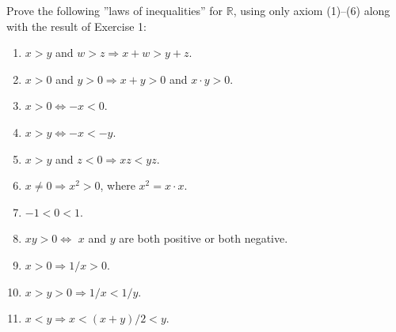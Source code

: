 \documentclass[a4paper,12pt]{article}
\begin{document}
\begin{exe}
	Prove the following ''laws of inequalities'' for \( \mathbb{R} \),
	using only axiom (1)--(6)
	along with the result of Exercise 1:
\end{exe}
\begin{enumerate}
	\item
	      \( x>y \)
	      and
	      \( w>z \Rightarrow x+w>y+z\).
	      
	\item
	      \( x>0 \)
	      and
	      \( y>0 \Rightarrow x+y>0\)
	      and
	      \( x \cdot y >0 \).
	      
	\item
	      \(  x>0 \Leftrightarrow -x <0\).
	      
	\item
	      \( x>y \Leftrightarrow -x < -y \).
	      
	\item
	      \( x>y \)
	      and
	      \( z<0 \Rightarrow xz<yz\).
	      
	\item
	      \( x \neq 0 \Rightarrow x^2 >0 \),
	      where \( x^2=x \cdot x \).
	      
	\item
	      \( -1 < 0< 1 \).
	      
	\item
	      \( xy>0 \Leftrightarrow \) \( x \) and \( y \) are both
	      positive or both negative. 
	      
	\item
	      \( x>0 \Rightarrow 1/x >0 \).
	      
	\item
	      \( x>y>0 \Rightarrow 1/x < 1/y \).
	      
	\item
	      \( x<y \Rightarrow x<(x+y)/2<y \).
\end{enumerate}
\end{document}
